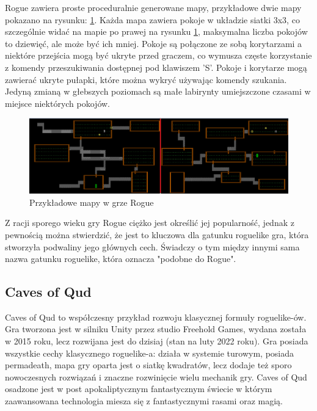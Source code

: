 \documentclass[12pt,twoside]{article}
\begin{document}
Rogue zawiera proste proceduralnie generowane mapy, przykładowe dwie mapy pokazano na rysunku: \ref{Rogue:scr3}. Każda mapa zawiera pokoje w układzie siatki 3x3, co szczególnie widać na mapie po prawej na rysunku \ref{Rogue:scr3}, maksymalna liczba pokojów to dziewięć, ale może być ich mniej. Pokoje są połączone ze sobą korytarzami a niektóre przejścia mogą być ukryte przed graczem, co wymusza częste korzystanie z komendy przeszukiwania dostępnej pod klawiszem 'S'. Pokoje i korytarze mogą zawierać ukryte pułapki, które można wykryć używając komendy szukania. Jedyną zmianą w głebszych poziomach są małe labirynty umiejszczone czasami w miejsce niektórych pokojów.

\FloatBarrier
\begin{figure}[h]
	\centering
	\includegraphics[width=16cm]{images/rogue/scr3.png}
	\caption{Przykładowe mapy w grze Rogue}
	\label{Rogue:scr3}
\end{figure}
\FloatBarrier

Z racji sporego wieku gry Rogue ciężko jest określić jej popularność, jednak z pewnością można stwierdzić, że jest to kluczowa dla gatunku roguelike gra, która stworzyła podwaliny jego głównych cech. Świadczy o tym między innymi sama nazwa gatunku roguelike, która oznacza "podobne do Rogue".



\subsection{Caves of Qud}
Caves of Qud to współczesny przykład rozwoju klasycznej formuły roguelike-ów. Gra tworzona jest w silniku Unity przez studio Freehold Games, wydana została w 2015 roku, lecz rozwijana jest do dzisiaj (stan na luty 2022 roku). Gra posiada wszystkie cechy klasycznego roguelike-a: działa w systemie turowym, posiada permadeath, mapa gry oparta jest o siatkę kwadratów, lecz dodaje też sporo nowoczesnych rozwiązań i znaczne rozwinięcie wielu mechanik gry. Caves of Qud osadzone jest w post apokaliptycznym fantastycznym świecie w którym zaawansowana technologia miesza się z fantastycznymi rasami oraz magią.
\end{document}
